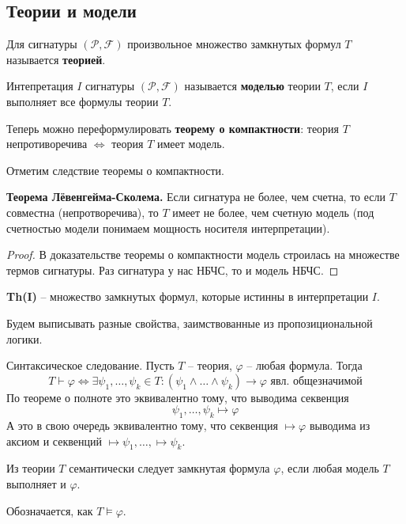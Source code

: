 \subsection{Теории и модели}
\begin{conj}
    Для сигнатуры $(\mathcal{P}, \mathcal{F})$ произвольное множество замкнутых формул $T$ называется \textbf{теорией}.
\end{conj}
\begin{conj}
    Интепретация $I$ сигнатуры $(\mathcal{P}, \mathcal{F})$ называется \textbf{моделью} теории $T$, если $I$ выполняет все формулы теории $T$.
\end{conj}
Теперь можно переформулировать \textbf{теорему о компактности}: теория $T$ непротиворечива $\Longleftrightarrow$ теория $T$ имеет модель.

Отметим следствие теоремы о компактности.

\begin{follow}
    \textbf{Теорема Лёвенгейма-Сколема.} 
    Если сигнатура не более, чем счетна, то если $T$ совместна (непротворечива), то $T$ имеет не более, чем счетную модель (под счетностью модели понимаем мощность носителя интерпретации).
\end{follow}
\begin{proof}
    В доказательстве теоремы о компактности модель строилась на множестве термов сигнатуры. Раз сигнатура у нас НБЧС, то и модель НБЧС.
\end{proof}
\begin{conj}
    \textbf{Th(I)} -- множество замкнутых формул, которые истинны в интерпретации $I$.
\end{conj}

Будем выписывать разные свойства, заимствованные из пропозициональной логики.

\begin{conj}
    Синтаксическое следование. Пусть $T$ -- теория, $\varphi$ -- любая формула. Тогда \[ T \vdash \varphi \Longleftrightarrow \exists \psi_1, \dots, \psi_k \in T : (\psi_1 \land \dots \land \psi_k) \to \varphi \text{ явл. общезначимой} \]
    По теореме о полноте это эквивалентно тому, что выводима секвенция \[ \psi_1, \dots, \psi_k \mapsto \varphi  \]
    А это в свою очередь эквивалентно тому, что секвенция $\mapsto \varphi$ выводима из аксиом и секвенций $\mapsto \psi_1, \dots, \mapsto \psi_k$. 
\end{conj}

\begin{conj}
    Из теории $T$ семантически следует замкнутая формула $\varphi$, если любая модель $T$ выполняет и $\varphi$. 

    Обозначается, как $T \vDash \varphi$.
\end{conj}

